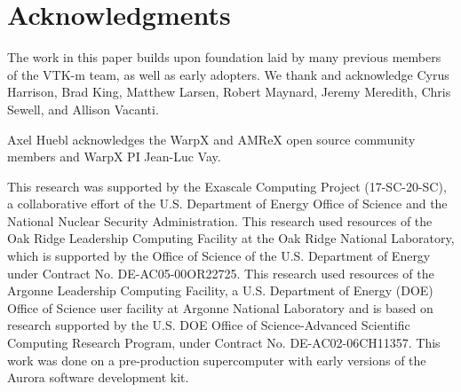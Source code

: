 \section{Acknowledgments}


The work in this paper builds upon foundation laid by many previous members of the VTK-m team, as well as early adopters.  We thank and acknowledge
Cyrus Harrison, 
Brad King, 
Matthew Larsen,
Robert Maynard, 
Jeremy Meredith, 
Chris Sewell, 
and
Allison Vacanti.

Axel Huebl acknowledges the WarpX and AMReX open source community members and WarpX PI Jean-Luc Vay.

This research was supported by the Exascale Computing Project (17-SC-20-SC), a collaborative effort of the U.S. Department of Energy Office of Science and the National Nuclear Security Administration.
This research used resources of the Oak Ridge Leadership Computing Facility at the Oak Ridge National Laboratory, which is supported by the Office of Science of the U.S. Department of Energy under Contract No. DE-AC05-00OR22725.
This research used resources of the Argonne Leadership Computing Facility, a U.S. Department of Energy (DOE) Office of Science user facility at Argonne National Laboratory and is based on research supported by the U.S. DOE Office of Science-Advanced Scientific Computing Research Program, under Contract No. DE-AC02-06CH11357. This work was done on a pre-production supercomputer with early versions of the Aurora software development kit.
